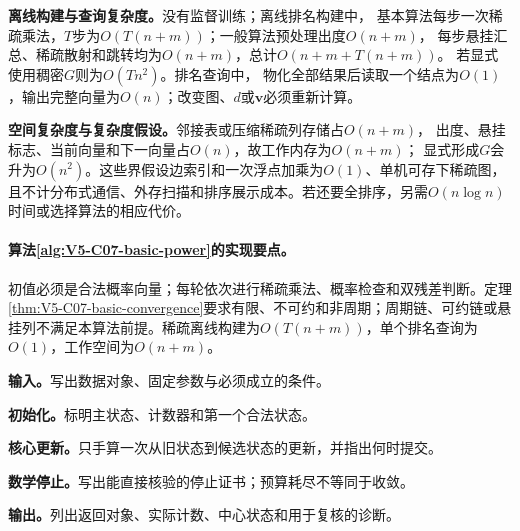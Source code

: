 \label{struct:V5-C07-CH26}
\textbf{离线构建与查询复杂度。}\PageRank{}没有监督训练；离线排名构建中，
基本算法每步一次稀疏乘法，$T$步为$O(T(n+m))$；一般算法预处理出度$O(n+m)$，
每步悬挂汇总、稀疏散射和跳转均为$O(n+m)$，总计$O(n+m+T(n+m))$。
若显式使用稠密$G$则为$O(Tn^2)$。排名查询中，
物化全部结果后读取一个结点为$O(1)$，输出完整向量为$O(n)$；改变图、$d$或$\boldsymbol v$必须重新计算。

\label{struct:V5-C07-CH27}
\textbf{空间复杂度与复杂度假设。}邻接表或压缩稀疏列存储占$O(n+m)$，
出度、悬挂标志、当前向量和下一向量占$O(n)$，故工作内存为$O(n+m)$；
显式形成$G$会升为$O(n^2)$。这些界假设边索引和一次浮点加乘为$O(1)$、单机可存下稀疏图，
且不计分布式通信、外存扫描和排序展示成本。若还要全排序，另需$O(n\log n)$时间或选择算法的相应代价。

\paragraph{算法\ref{alg:V5-C07-basic-power}的实现要点。}
初值必须是合法概率向量；每轮依次进行稀疏乘法、概率检查和双残差判断。定理\ref{thm:V5-C07-basic-convergence}要求有限、不可约和非周期；周期链、可约链或悬挂列不满足本算法前提。稀疏离线构建为$O(T(n+m))$，单个排名查询为$O(1)$，工作空间为$O(n+m)$。

\begingroup\SetAlgoLined

\begin{keypointbox}[title={基本 的稀疏幂迭代：五步阅读}]
\textbf{输入。}写出数据对象、固定参数与必须成立的条件。\par
\textbf{初始化。}标明主状态、计数器和第一个合法状态。\par
\textbf{核心更新。}只手算一次从旧状态到候选状态的更新，并指出何时提交。\par
\textbf{数学停止。}写出能直接核验的停止证书；预算耗尽不等同于收敛。\par
\textbf{输出。}列出返回对象、实际计数、中心状态和用于复核的诊断。
\end{keypointbox}

